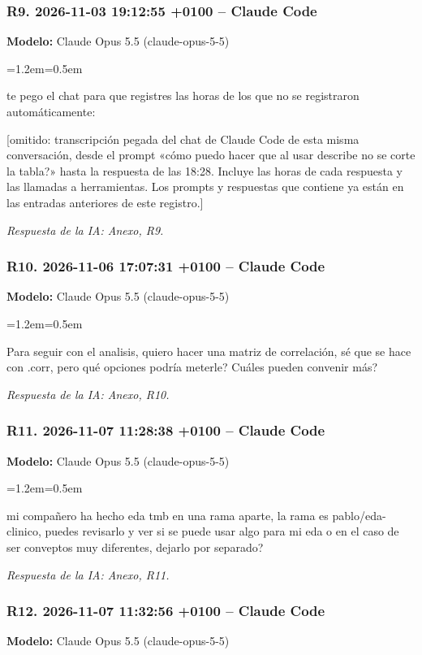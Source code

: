 \documentclass[11pt,a4paper]{article}
\newenvironment{prompt}
  {\par\smallskip\begin{list}{}{\leftmargin=1.2em\rightmargin=0.5em}\item\relax\small\color{black!80}}
  {\end{list}\smallskip}
\begin{document}
\subsubsection*{R9. 2026-11-03 19:12:55 +0100 -- Claude Code}
\textbf{Modelo:} Claude Opus 5.5 (claude-opus-5-5)

\begin{prompt}
te pego el chat para que registres las horas de los que no se registraron automáticamente:

[omitido: transcripción pegada del chat de Claude Code de esta misma conversación, desde el prompt «cómo puedo hacer que al usar describe no se corte la tabla?» hasta la respuesta de las 18:28. Incluye las horas de cada respuesta y las llamadas a herramientas. Los prompts y respuestas que contiene ya están en las entradas anteriores de este registro.]
\end{prompt}

\textit{Respuesta de la IA: Anexo, R9.}

\subsubsection*{R10. 2026-11-06 17:07:31 +0100 -- Claude Code}
\textbf{Modelo:} Claude Opus 5.5 (claude-opus-5-5)

\begin{prompt}
Para seguir con el analisis, quiero hacer una matriz de correlación, sé que se hace con .corr, pero qué opciones podría meterle? Cuáles pueden convenir más?
\end{prompt}

\textit{Respuesta de la IA: Anexo, R10.}

\subsubsection*{R11. 2026-11-07 11:28:38 +0100 -- Claude Code}
\textbf{Modelo:} Claude Opus 5.5 (claude-opus-5-5)

\begin{prompt}
mi compañero ha hecho eda tmb en una rama aparte, la rama es pablo/\allowbreak{}eda-clinico, puedes revisarlo y ver si se puede usar algo para mi eda o en el caso de ser conveptos muy diferentes, dejarlo por separado?
\end{prompt}

\textit{Respuesta de la IA: Anexo, R11.}

\subsubsection*{R12. 2026-11-07 11:32:56 +0100 -- Claude Code}
\textbf{Modelo:} Claude Opus 5.5 (claude-opus-5-5)
\end{document}
